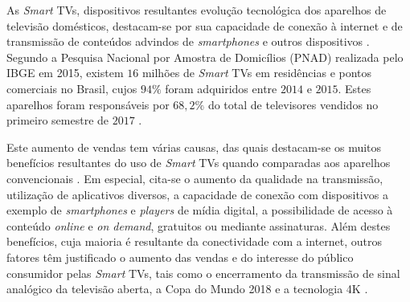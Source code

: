 As \emph{Smart} TVs, dispositivos resultantes evolução tecnológica dos aparelhos de televisão domésticos, destacam-se por sua capacidade de conexão à internet e de transmissão de conteúdos advindos de \emph{smartphones} e outros dispositivos \cite{samsung:smarttv,perakakis2015proposed}.
Segundo a Pesquisa Nacional por Amostra de Domicílios (PNAD) realizada pelo IBGE em 2015, existem $16$ milhões de \emph{Smart} TVs em residências e pontos comerciais no Brasil, cujos $94\%$ foram adquiridos entre $2014$ e $2015$. Estes aparelhos foram responsáveis por $68,2\%$ do total de televisores vendidos no primeiro semestre de $2017$ \cite{pnad2015}.



Este aumento de vendas tem várias causas, das quais destacam-se os muitos benefícios resultantes do uso de \emph{Smart} TVs quando comparadas aos aparelhos convencionais \cite{shin2013smart,differencebetween}. Em especial, cita-se o aumento da qualidade na transmissão, utilização de aplicativos diversos, a capacidade de conexão com dispositivos a exemplo de \emph{smartphones} e \emph{players} de mídia digital, a possibilidade de acesso à conteúdo \emph{online} e \emph{on demand}, gratuitos ou mediante assinaturas. Além destes benefícios, cuja maioria é resultante da conectividade com a internet, outros fatores têm justificado o aumento das vendas e do interesse do público consumidor pelas \emph{Smart} TVs, tais como o encerramento da transmissão de sinal analógico da televisão aberta, a Copa do Mundo 2018 e a tecnologia 4K \cite{leiajabuscasmart,correiopnad,estadao:explosaovideosonline}.

